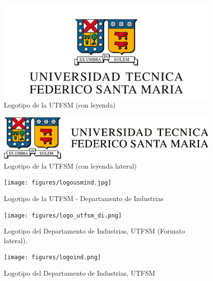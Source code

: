 \begin{figure}[ht!]
\centering
\includegraphics[scale = .45]{figures/logousmleyenda.png}
\caption{Logotipo de la UTFSM (con leyenda)}
\label{fig:logousm_leyenda}
\end{figure}


\begin{figure}[ht!]
\centering
\includegraphics[width = .85\textwidth]{figures/logousm-lateral.png}
\caption{Logotipo de la UTFSM (con leyenda lateral)}
\label{fig:logousm_leyenda_lateral}
\end{figure}


\begin{figure}[ht!]
\centering
\texttt{[image: figures/logousmind.jpg]}
\caption{Logotipo de la UTFSM - Departamento de Industrias}
\label{fig:logousm_industrias}
\end{figure}

\begin{figure}[ht!]
    \centering
    \texttt{[image: figures/logo\_utfsm\_di.png]}
    \caption{Logotipo del Departamento de Industrias, UTFSM (Formato lateral).}
    \label{fig:logousm_industrias_lateral}
\end{figure}

\begin{figure}[ht!]
\centering
\texttt{[image: figures/logoind.png]}
\caption{Logotipo del Departamento de Industrias, UTFSM }
\label{fig:logoindustrias}
\end{figure}

